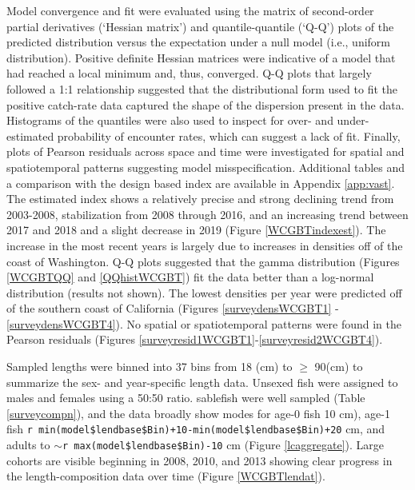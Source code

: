 \documentclass[11pt,
  english,
  a4paper,
]{article}
\begin{document}
Model convergence and fit were evaluated using the matrix of second-order partial derivatives (`Hessian matrix') and quantile-quantile (`Q-Q') plots of the predicted distribution versus the expectation under a null model (i.e., uniform distribution). Positive definite Hessian matrices were indicative of a model that had reached a local minimum and, thus, converged. Q-Q plots that largely followed a 1:1 relationship suggested that the distributional form used to fit the positive catch-rate data captured the shape of the dispersion present in the data. Histograms of the quantiles were also used to inspect for over- and under-estimated probability of encounter rates, which can suggest a lack of fit. Finally, plots of Pearson residuals across space and time were investigated for spatial and spatiotemporal patterns suggesting model misspecification. Additional tables and a comparison with the design based index are available in Appendix \ref{app:vast}. The estimated index shows a relatively precise and strong declining trend from 2003-2008, stabilization from 2008 through 2016, and an increasing trend between 2017 and 2018 and a slight decrease in 2019 (Figure \ref{WCGBTindexest}). The increase in the most recent years is largely due to increases in densities off of the coast of Washington. Q-Q plots suggested that the gamma distribution (Figures \ref{WCGBTQQ} and \ref{QQhistWCGBT}) fit the data better than a log-normal distribution (results not shown). The lowest densities per year were predicted off of the southern coast of California (Figures \ref{surveydensWCGBT1} - \ref{surveydensWCGBT4}). No spatial or spatiotemporal patterns were found in the Pearson residuals (Figures \ref{surveyresid1WCGBT1}-\ref{surveyresid2WCGBT4}).

\leavevmode\tagmcend\tagstructend\par

Sampled lengths were binned into 37 bins from 18 (cm) to {\(\geq\)\leavevmode\tagmcend\tagstructend} 90(cm) to summarize the sex- and year-specific length data. Unsexed fish were assigned to males and females using a 50:50 ratio. sablefish were well sampled (Table \ref{surveycompn}), and the data broadly show modes for age-0 fish 10 cm), age-1 fish \texttt{r\ min(model\$lendbase\$Bin)+10-min(model\$lendbase\$Bin)+20} cm, and adults to {\(\sim\)\leavevmode\tagmcend\tagstructend}\texttt{r\ max(model\$lendbase\$Bin)-10} cm (Figure \ref{lcaggregate}). Large cohorts are visible beginning in 2008, 2010, and 2013 showing clear progress in the length-composition data over time (Figure \ref{WCGBTlendat}).
\end{document}
